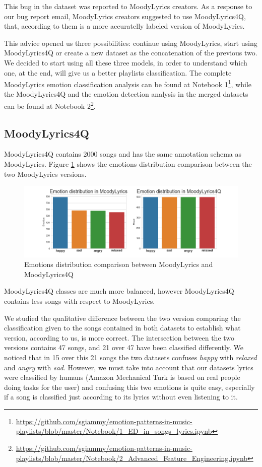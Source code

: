 This bug in the dataset was reported to MoodyLyrics creators. As a response to our bug report email, MoodyLyrics creators suggested to use MoodyLyrics4Q\cite{moodylyrics4q}, that, according to them is a more accuratelly labeled version of MoodyLyrics.\par

This advice opened us three possibilities: continue using MoodyLyrics, start using MoodyLyrics4Q or create a new dataset as the concatenation of the previous two. We decided to start using all these three models, in order to understand which one, at the end, will give us a better playlists classification. The complete MoodyLyrics emotion classification analysis can be found at Notebook 1\footnote{\url{https://github.com/sgiammy/emotion-patterns-in-music-playlists/blob/master/Notebook/1_ED_in_songs_lyrics.ipynb}}, while the MoodyLyrics4Q and the emotion detection analysis in the merged datasets can be found at Notebook 2\footnote{\url{https://github.com/sgiammy/emotion-patterns-in-music-playlists/blob/master/Notebook/2_Advanced_Feature_Engineering.ipynb}}.


\subsection{MoodyLyrics4Q}
MoodyLyrics4Q contains 2000 songs and has the same annotation schema as MoodyLyrics. Figure \ref{fig:stats} shows the emotions distribution comparison between the two MoodyLyrics versions.

\begin{figure}[H]
\centering
\includegraphics[width=1.1\textwidth]{./chapters/chapter4/images/Stats.png}
\caption{Emotions distribution comparison between MoodyLyrics and MoodyLyrics4Q}
\label{fig:stats}
\end{figure}

MoodyLyrics4Q classes are much more balanced, however MoodyLyrics4Q contains less songs with respect to MoodyLyrics. \par
We studied the qualitative difference between the two version comparing the classification given to the songs contained in both datasets to establish what version, according to us, is more correct. The intersection between the two versions contains 47 songs, and 21 over 47 have been classified differently. We noticed that in 15 over this 21 songs the two datasets confuses \textit{happy} with \textit{relaxed} and \textit{angry} with \textit{sad}. However, we must take into account that our datasets lyrics were classified by humans (Amazon Mechanical Turk\cite{amazon-turk} is based on real people doing tasks for the user) and confusing this two emotions is quite easy, especially if a song is classified just according to its lyrics without even listening to it.


